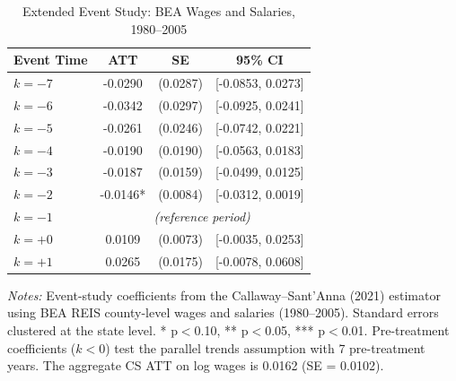 \begin{table}[H]
\centering
\caption{Extended Event Study: BEA Wages and Salaries, 1980--2005}
\begin{threeparttable}
\begin{tabular}{lccc}
\toprule
Event Time & ATT & SE & 95\% CI \\
\midrule
$k = -7$ & -0.0290 & (0.0287) & [-0.0853, 0.0273] \\
$k = -6$ & -0.0342 & (0.0297) & [-0.0925, 0.0241] \\
$k = -5$ & -0.0261 & (0.0246) & [-0.0742, 0.0221] \\
$k = -4$ & -0.0190 & (0.0190) & [-0.0563, 0.0183] \\
$k = -3$ & -0.0187 & (0.0159) & [-0.0499, 0.0125] \\
$k = -2$ & -0.0146* & (0.0084) & [-0.0312, 0.0019] \\
$k = -1$ & \multicolumn{3}{c}{\textit{(reference period)}} \\
$k = +0$ & 0.0109 & (0.0073) & [-0.0035, 0.0253] \\
$k = +1$ & 0.0265 & (0.0175) & [-0.0078, 0.0608] \\
\bottomrule
\end{tabular}
\begin{tablenotes}[flushleft]
\small
\item \textit{Notes:} Event-study coefficients from the Callaway--Sant'Anna (2021) estimator using BEA REIS county-level wages and salaries (1980--2005). Standard errors clustered at the state level. * p$<$0.10, ** p$<$0.05, *** p$<$0.01. Pre-treatment coefficients ($k < 0$) test the parallel trends assumption with 7 pre-treatment years. The aggregate CS ATT on log wages is 0.0162 (SE = 0.0102).
\end{tablenotes}
\end{threeparttable}
\label{tab:eventstudy}
\end{table}
